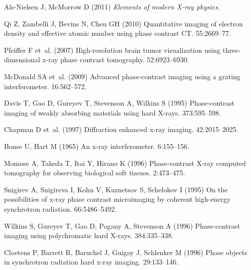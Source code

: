 \documentclass{pnastwo}
\begin{document}
\begin{article}
%
%
\begin{thebibliography}{10}

Als-Nielsen J, McMorrow D (2011) {\em {Elements of modern X-ray physics}}.

Qi Z, Zambelli J, Bevins N, Chen GH (2010) {Quantitative imaging of electron
  density and effective atomic number using phase contrast CT.}
 55:2669--77.

Pfeiffer F et~al. (2007) {High-resolution brain tumor visualization using
  three-dimensional x-ray phase contrast tomography.}
 52:6923--6930.

McDonald SA et~al. (2009) {Advanced phase-contrast imaging using a grating
  interferometer}.
 16:562--572.

Davis T, Gao D, Gureyev T, Stevenson A, Wilkins S (1995) {Phase-contrast
  imaging of weakly absorbing materials using hard X-rays}.
 373:595--598.

Chapman D et~al. (1997) {Diffraction enhanced x-ray imaging}.
 42:2015--2025.

Bonse U, Hart M (1965) {An x-ray interferometer}.
 6:155--156.

Momose A, Takeda T, Itai Y, Hirano K (1996) {Phase-contrast X-ray computed
  tomography for observing biological soft tissues}.
 2:473--475.

Snigirev A, Snigireva I, Kohn V, Kuznetsov S, Schelokov I (1995) {On the
  possibilities of x-ray phase contrast microimaging by coherent high-energy
  synchrotron radiation}.
 66:5486--5492.

Wilkins S, Gureyev T, Gao D, Pogany A, Stevenson A (1996) {Phase-contrast
  imaging using polychromatic hard X-rays}.
 384:335--338.

Cloetens P, Barrett R, Baruchel J, Guigay J, Schlenker M (1996) {Phase objects
  in synchrotron radiation hard x-ray imaging}.
 29:133--146.


\end{thebibliography}
\end{article}
\end{document}
